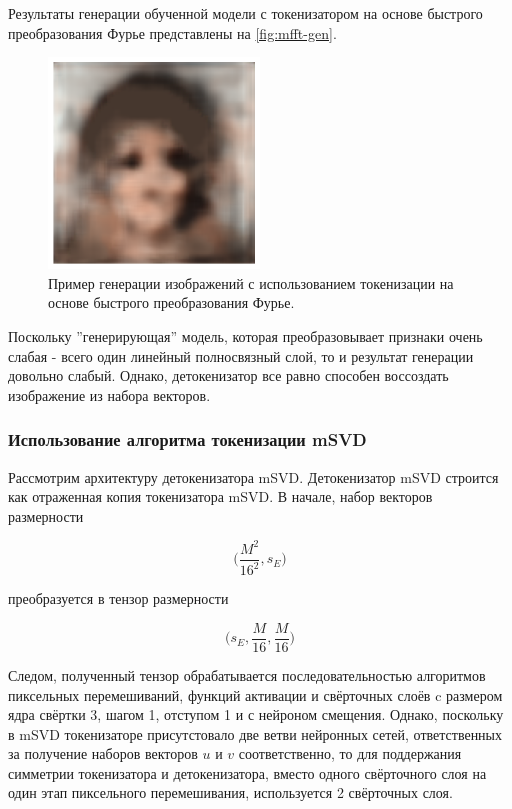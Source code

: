 Результаты генерации обученной модели с токенизатором на основе быстрого преобразования Фурье представлены на \autoref{fig:mfft-gen}.

\begin{figure}[H]
    \centering
    \includegraphics[width=0.5\textwidth]
    {images/generation/mfft_gen1.png}
    \caption{Пример генерации изображений с использованием токенизации на основе быстрого преобразования Фурье.}
    \label{fig:mfft-gen}
\end{figure}

Поскольку ''генерирующая'' модель, которая преобразовывает признаки очень слабая - всего один линейный полносвязный слой, то и результат генерации довольно слабый. Однако, детокенизатор все равно способен воссоздать изображение из набора векторов.

\subsubsection{Использование алгоритма токенизации mSVD}

Рассмотрим архитектуру детокенизатора mSVD. Детокенизатор mSVD строится как отраженная копия токенизатора mSVD. В начале, набор векторов размерности

$$
\Big(\dfrac{M^2}{16^2}, s_E\Big)
$$

преобразуется в тензор размерности

$$
\Big(s_E, \dfrac{M}{16}, \dfrac{M}{16}\Big)
$$

Следом, полученный тензор обрабатывается последовательностью алгоритмов пиксельных перемешиваний, функций активации и свёрточных слоёв c размером ядра свёртки 3, шагом 1, отступом 1 и с нейроном смещения. Однако, поскольку в mSVD токенизаторе присутстовало две ветви нейронных сетей, ответственных за получение наборов векторов $u$ и $v$ соответственно, то для поддержания симметрии токенизатора и детокенизатора, вместо одного свёрточного слоя на один этап пиксельного перемешивания, используется 2 свёрточных слоя.


